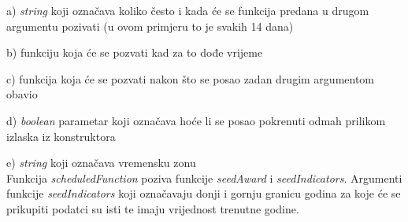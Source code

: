 \documentclass[times, utf8, zavrsni]{fer}
\begin{document}
    a) \emph{string} koji označava koliko često i kada će se funkcija predana u drugom argumentu pozivati (u ovom primjeru to je svakih 14 dana)

    b) funkciju koja će se pozvati kad za to dođe vrijeme

    c) funkcija koja će se pozvati nakon što se posao zadan drugim argumentom obavio 

    d) \emph{boolean} parametar koji označava hoće li se posao pokrenuti odmah prilikom izlaska iz konstruktora

    e) \emph{string} koji označava vremensku zonu
\\Funkcija \emph{scheduledFunction} poziva funkcije \emph{seedAward} i \emph{seedIndicators}. Argumenti funkcije \emph{seedIndicators}  
koji označavaju donji i gornju granicu godina za koje će se prikupiti podatci su isti te imaju vrijednost trenutne godine.
\end{document}
